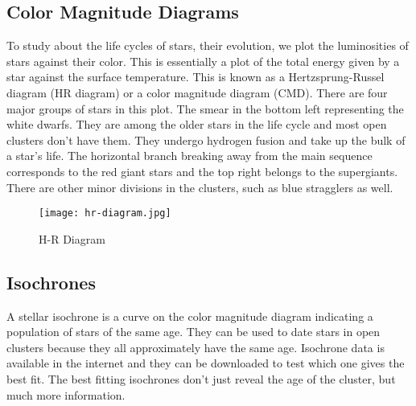\subsection{Color Magnitude Diagrams}
To study about the life cycles of stars, their evolution, we plot the luminosities of stars against their color. This is essentially a plot of the total energy given by a star against the surface temperature. This is known as a Hertzsprung-Russel diagram (HR diagram) or a color magnitude diagram (CMD). There are four major groups of stars in this plot. The smear in the bottom left representing the white dwarfs. They are among the older stars in the life cycle and most open clusters don't have them. They undergo hydrogen fusion and take up the bulk of a star's life. The horizontal branch breaking away from the main sequence corresponds to the red giant stars and the top right belongs to the supergiants. There are other minor divisions in the clusters, such as blue stragglers as well.  \citep{introstars}

\begin{figure}[H]
	\centering
	\texttt{[image: hr-diagram.jpg]}
	\caption{H-R Diagram \citep{wimecommons}}
	\label{fig:image1}
\end{figure}

\subsection{Isochrones}
A stellar isochrone is a curve on the color magnitude diagram indicating a population of stars of the same age. They can be used to date stars in open clusters because they all approximately have the same age. Isochrone data is available in the internet and they can be downloaded to test which one gives the best fit. The best fitting isochrones don't just reveal the age of the cluster, but much more information.



